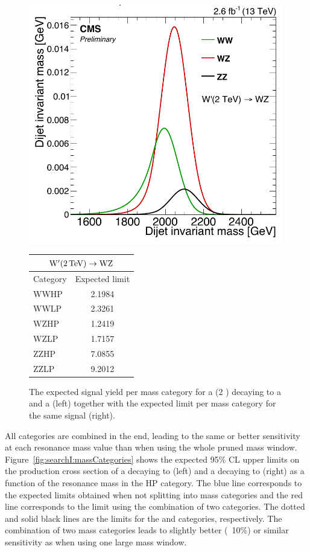  \begin{figure}
 \centering
 \begin{minipage}{0.5\textwidth}
 \centering
 \includegraphics[width=0.99\textwidth]{figures/analysis/search1/misc/massCategories.pdf}
 \end{minipage}
 \begin{minipage}{0.29\textwidth}
 \centering
 \captionsetup{type=table} %
 \begin{tabular}{| l | c |}
 \hline
 \multicolumn{2}{|c|}{$\mathrm{W}^\prime (2 \,\text{Te\hspace{-.08em}V}) \rightarrow \mathrm{W}\mathrm{Z}$}\\
 \hline
 Category & Expected limit \\
 \hline
 WWHP & 2.1984 \\ 
 WWLP & 2.3261 \\ 
 WZHP & 1.2419 \\ 
 WZLP & 1.7157 \\ 
 ZZHP & 7.0855 \\ 
 ZZLP & 9.2012 \\ 
 \hline
 \end{tabular}
 \end{minipage}
 \caption{The expected signal yield per mass category for a \PWpr (2 \TeV) decaying to a \PW and a \PZ (left) together with the expected limit per mass category for the same signal (right).}
 \label{fig:searchI:massCatWpr}
 \end{figure}
All categories are combined in the end, leading to the same or better sensitivity at each resonance mass value than when using the whole pruned mass window. Figure~\ref{fig:searchI:massCategories} shows the expected 95\% CL upper limits on the production cross section of a \PWpr decaying to \WZ (left) and a \BulkG decaying to \WW (right) as a function of the resonance mass in the HP category. The blue line corresponds to the expected limits obtained when not splitting into mass categories and the red line corresponds to the limit using the combination of two categories. The dotted and solid black lines are the limits for the \PW and \PZ categories, respectively. The combination of two mass categories leads to slightly better (~10\%) or similar sensitivity as when using one large mass window.

